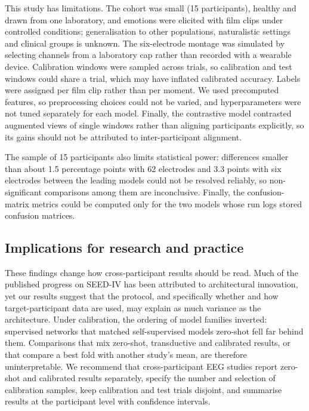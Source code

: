 This study has limitations. The cohort was small (15 participants), healthy and drawn from one laboratory, and emotions were elicited with film clips under controlled conditions; generalisation to other populations, naturalistic settings and clinical groups is unknown\cite{seed,seedv,faced}. The six-electrode montage was simulated by selecting channels from a laboratory cap rather than recorded with a wearable device. Calibration windows were sampled across trials, so calibration and test windows could share a trial, which may have inflated calibrated accuracy\cite{liblock}. Labels were assigned per film clip rather than per moment. We used precomputed features, so preprocessing choices could not be varied, and hyperparameters were not tuned separately for each model. Finally, the contrastive model contrasted augmented views of single windows rather than aligning participants explicitly, so its gains should not be attributed to inter-participant alignment.

The sample of 15 participants also limits statistical power: differences smaller than about 1.5 percentage points with 62 electrodes and 3.3 points with six electrodes between the leading models could not be resolved reliably, so non-significant comparisons among them are inconclusive. Finally, the confusion-matrix metrics could be computed only for the two models whose run logs stored confusion matrices.


\subsection{Implications for research and practice}
These findings change how cross-participant results should be read. Much of the published progress on SEED-IV has been attributed to architectural innovation, yet our results suggest that the protocol, and specifically whether and how target-participant data are used, may explain as much variance as the architecture. Under calibration, the ordering of model families inverted: supervised networks that matched self-supervised models zero-shot fell far behind them. Comparisons that mix zero-shot, transductive and calibrated results, or that compare a best fold with another study's mean, are therefore uninterpretable. We recommend that cross-participant EEG studies report zero-shot and calibrated results separately, specify the number and selection of calibration samples, keep calibration and test trials disjoint, and summarise results at the participant level with confidence intervals\cite{tripod,kapoor}.

